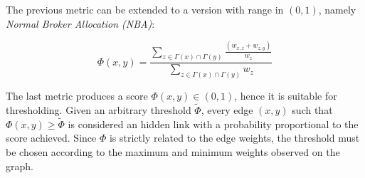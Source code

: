 
The previous metric can be extended to a version with range in $(0,1)$, namely \textit{Normal Broker Allocation (NBA)}:

\begin{equation}
\label{eqn:nba-local}
\Phi(x,y)=
\frac{\sum\limits_{z\in\Gamma(x)\cap\Gamma(y)}\frac{(w_{x,z}+w_{z,y})}{w_{z}}}
{\sum\limits_{z\in\Gamma(x)\cap\Gamma(y)}w_{z}}
\end{equation}

The last metric produces a score $\Phi(x,y)\in(0,1)$, hence it is suitable for thresholding.
%
Given an arbitrary threshold $\tilde{\Phi}$, every edge $(x,y)$ such that $\Phi(x,y)\geq\tilde{\Phi}$ is considered an hidden link with a probability proportional to the score achieved.
%
Since $\Phi$ is strictly related to the edge weights, the threshold must be chosen according to the maximum and minimum weights observed on the graph.







